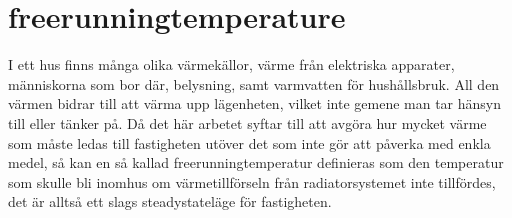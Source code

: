 \section{freerunningtemperature}
I ett hus finns många olika värmekällor, värme från elektriska apparater, människorna som bor där, belysning, samt varmvatten för hushållsbruk. All den värmen bidrar till att värma upp lägenheten, vilket inte gemene man tar hänsyn till eller tänker på. Då det här arbetet syftar till att avgöra hur mycket värme som måste ledas till fastigheten utöver det som inte gör att påverka med enkla medel, så kan en så kallad freerunningtemperatur definieras som den temperatur som skulle bli inomhus om värmetillförseln från radiatorsystemet inte tillfördes, det är alltså ett slags steadystateläge för fastigheten.